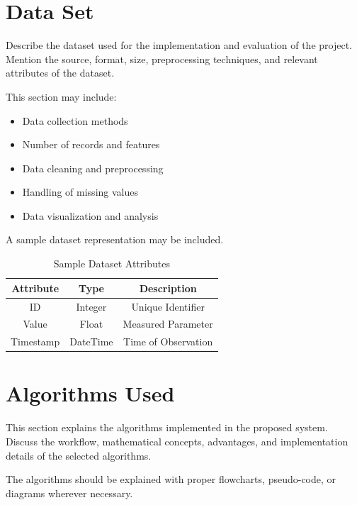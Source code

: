 \section{Data Set}

Describe the dataset used for the implementation and evaluation of the project. Mention the source, format, size, preprocessing techniques, and relevant attributes of the dataset.

This section may include:
\begin{itemize}
    \item Data collection methods
    \item Number of records and features
    \item Data cleaning and preprocessing
    \item Handling of missing values
    \item Data visualization and analysis
\end{itemize}

A sample dataset representation may be included.

\begin{table}[htb]
\centering
\caption{Sample Dataset Attributes}
\label{tab:dataset_attributes}
\begin{tabular}{|c|c|c|}
\hline
\textbf{Attribute} & \textbf{Type} & \textbf{Description} \\
\hline
ID & Integer & Unique Identifier \\
\hline
Value & Float & Measured Parameter \\
\hline
Timestamp & DateTime & Time of Observation \\
\hline
\end{tabular}
\end{table}


\section{Algorithms Used}

This section explains the algorithms implemented in the proposed system. Discuss the workflow, mathematical concepts, advantages, and implementation details of the selected algorithms.

The algorithms should be explained with proper flowcharts, pseudo-code, or diagrams wherever necessary.


